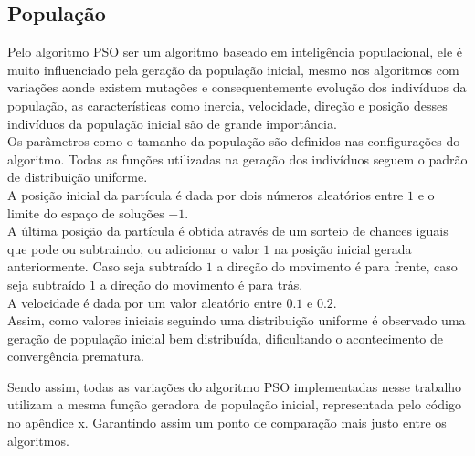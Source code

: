 \subsection{População}
Pelo algoritmo PSO ser um algoritmo baseado em inteligência populacional, ele é muito influenciado pela geração da população inicial, mesmo nos algoritmos com variações aonde existem mutações e consequentemente evolução dos indivíduos da população, as características como inercia, velocidade, direção e posição desses indivíduos da população inicial são de grande importância.\\
\indent Os parâmetros como o tamanho da população são definidos nas configurações do algoritmo. Todas as funções utilizadas na geração dos indivíduos seguem o padrão de distribuição uniforme.\\
\indent A posição inicial da partícula é dada por dois números aleatórios entre $1$ e o limite do espaço de soluções $- 1$.\\
\indent A última posição da partícula é obtida através de um sorteio de chances iguais que pode ou subtraindo, ou adicionar o valor $1$ na posição inicial gerada anteriormente. Caso seja subtraído $1$ a direção do movimento é para frente, caso seja subtraído $1$ a direção do movimento é para trás.\\
\indent A velocidade é dada por um valor aleatório entre $0.1$ e $0.2$.\\
\indent Assim, como valores iniciais seguindo uma distribuição uniforme é observado uma geração de população inicial bem distribuída, dificultando o acontecimento de convergência prematura.

Sendo assim, todas as variações do algoritmo PSO implementadas nesse trabalho utilizam a mesma função geradora de população inicial, representada pelo código no apêndice x. %
\noindent Garantindo assim um ponto de comparação mais justo entre os algoritmos.
